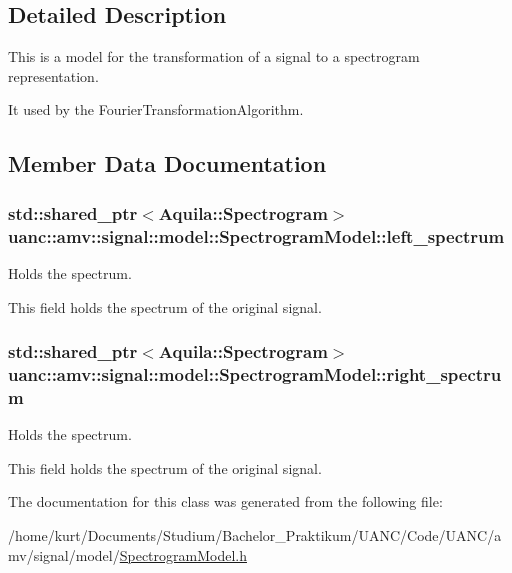 \subsection{Detailed Description}
This is a model for the transformation of a signal to a spectrogram representation. 

It used by the Fourier\+Transformation\+Algorithm. 

\subsection{Member Data Documentation}
\subsubsection[{\texorpdfstring{left\+\_\+spectrum}{left_spectrum}}]{\setlength{\rightskip}{0pt plus 5cm}std\+::shared\+\_\+ptr$<$Aquila\+::\+Spectrogram$>$ uanc\+::amv\+::signal\+::model\+::\+Spectrogram\+Model\+::left\+\_\+spectrum}\hypertarget{classuanc_1_1amv_1_1signal_1_1model_1_1_spectrogram_model_accb3ed97c155fdec9022bb2d5b106015}{}\label{classuanc_1_1amv_1_1signal_1_1model_1_1_spectrogram_model_accb3ed97c155fdec9022bb2d5b106015}


Holds the spectrum. 

This field holds the spectrum of the original signal. 
\subsubsection[{\texorpdfstring{right\+\_\+spectrum}{right_spectrum}}]{\setlength{\rightskip}{0pt plus 5cm}std\+::shared\+\_\+ptr$<$Aquila\+::\+Spectrogram$>$ uanc\+::amv\+::signal\+::model\+::\+Spectrogram\+Model\+::right\+\_\+spectrum}\hypertarget{classuanc_1_1amv_1_1signal_1_1model_1_1_spectrogram_model_a3a3559cdc08ae00f3617de962e606c4a}{}\label{classuanc_1_1amv_1_1signal_1_1model_1_1_spectrogram_model_a3a3559cdc08ae00f3617de962e606c4a}


Holds the spectrum. 

This field holds the spectrum of the original signal. 

The documentation for this class was generated from the following file\+:\begin{DoxyCompactItemize}
\item 
/home/kurt/\+Documents/\+Studium/\+Bachelor\+\_\+\+Praktikum/\+U\+A\+N\+C/\+Code/\+U\+A\+N\+C/amv/signal/model/\hyperlink{_spectrogram_model_8h}{Spectrogram\+Model.\+h}\end{DoxyCompactItemize}
